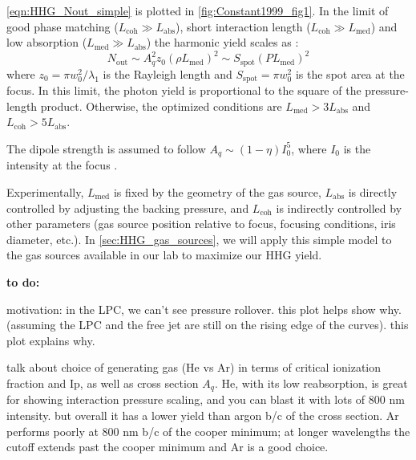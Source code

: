 \cref{eqn:HHG_Nout_simple} is plotted in \cref{fig:Constant1999_fig1}.  In the limit of good phase matching ($L_{\textrm{coh}} \gg L_{\textrm{abs}}$), short interaction length ($L_{\textrm{coh}} \gg L_{\textrm{med}}$) and low absorption ($L_{\textrm{med}} \gg L_{\textrm{abs}}$) the harmonic yield scales as \cite{takahashiGenerationStrongOptical2004}:
\begin{equation}
N_{\textrm{out}} \sim A_q^2 z_0 (\rho L_{\textrm{med}})^2 \sim S_{\textrm{spot}} (P L_{\textrm{med}})^2
\label{eqn:HHG_Nout_2}
\end{equation}
where $z_0 = \pi w_0^2 / \lambda_1$ is the Rayleigh length and $S_{\textrm{spot}} = \pi w_0^2$ is the spot area at the focus. In this limit, the photon yield is proportional to the square of the pressure-length product. Otherwise, the optimized conditions are $L_{\textrm{med}} > 3 L_{\textrm{abs}}$ and $L_{\textrm{coh}} > 5 L_{\textrm{abs}}$.

The dipole strength is assumed to follow $A_q \sim (1-\eta)I_0^5$, where $I_0$ is the intensity at the focus \cite{krauseCalculationPhotoemissionAtoms1992,kuhnELIALPSFacilityNext2017}.

Experimentally, $L_{\textrm{med}}$ is fixed by the geometry of the gas source, $L_{\textrm{abs}}$ is directly controlled by adjusting the backing pressure, and $L_{\textrm{coh}}$ is indirectly controlled by other parameters (gas source position relative to focus, focusing conditions, iris diameter, etc.). In \cref{sec:HHG_gas_sources}, we will apply this simple model to the gas sources available in our lab to maximize our HHG yield.

\textbf{to do:}

motivation: in the LPC, we can't see pressure rollover. this plot helps show why. (assuming the LPC and the free jet are still on the rising edge of the curves). this plot explains why.

talk about choice of generating gas (He vs Ar) in terms of critical ionization fraction and Ip, as well as cross section $A_q$. He, with its low reabsorption, is great for showing interaction pressure scaling, and you can blast it with lots of 800 nm intensity. but overall it has a lower yield than argon b/c of the cross section. Ar performs poorly at 800 nm b/c of the cooper minimum; at longer wavelengths the cutoff extends past the cooper minimum and Ar is a good choice.

